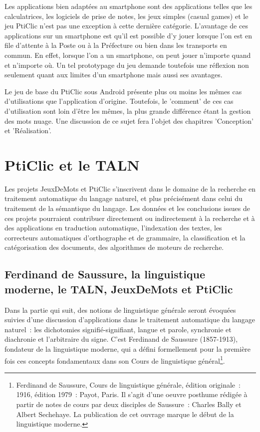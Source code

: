 \documentclass[a4paper,11pt,french]{article}
\def\android{Android\texttrademark{}}
\begin{document}
Les applications bien adaptées au smartphone sont des applications telles que les calculatrices, les logiciels de prise de notes, les jeux
simples (casual games) et le jeu PtiClic n'est pas une exception à cette dernière catégorie. L'avantage de ces applications sur un smartphone est
qu'il est possible d'y jouer lorsque l'on est en file d'attente à la Poste ou à la Préfecture ou bien dans les transports en commun. En effet, lorsque l'on a un smartphone, on peut jouer n'importe quand et n'importe où. Un tel
prototypage du jeu demande toutefois une réflexion non seulement quant aux limites d'un smartphone mais aussi ses avantages.

Le jeu de base du PtiClic sous \android{} présente plus ou moins les mêmes cas d'utilisations que l'application d'origine. Toutefois, le 'comment' de ces cas d'utilisation sont loin d'être les mêmes, la plus grande différence étant la gestion des mots nuage. Une discussion de ce sujet fera l'objet des chapitres 'Conception' et 'Réalisation'.

\pagebreak

\section{PtiClic et le TALN}


Les projets JeuxDeMots et PtiClic s'inscrivent dans le domaine de la recherche en traitement automatique du langage naturel, et plus précisément dans celui du traitement de la sémantique du langage. Les données et les conclusions issues de ces projets pourraient contribuer directement ou indirectement à la recherche et à des applications en traduction automatique, l'indexation des textes, les correcteurs automatiques d'orthographe et de grammaire, la classification et la catégorisation des documents, des algorithmes de moteurs de recherche.


\subsection{Ferdinand de Saussure, la linguistique moderne, le TALN, JeuxDeMots et PtiClic}

Dans la partie qui suit, des notions de linguistique générale seront évoquées suivies d'une discussion d'applications dans le traitement automatique du langage naturel~: les dichotomies signifié-signifiant, langue et parole, synchronie et diachronie et l'arbitraire du signe. C'est Ferdinand de Saussure (1857-1913), fondateur de la linguistique moderne, qui a défini formellement pour la première fois ces concepts fondamentaux dans son Cours de linguistique général\footnote{Ferdinand de Saussure, Cours de linguistique générale, édition originale~: 1916, édition 1979~: Payot, Paris. Il s'agit d'une oeuvre posthume rédigée à partir de notes de cours par deux disciples de Saussure~: Charles Bally et Albert Sechehaye. La publication de cet ouvrage marque le début de la linguistique moderne.}.
\end{document}
